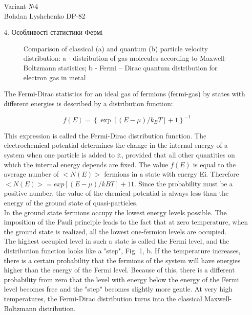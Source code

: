 \documentclass[a4paper,14pt]{extreport}
\begin{document}
\pagecolor{white}


\begin{center}
Variant №4\\
\vspace{0.5cm}
Bohdan Lyshchenko DP-82
\end{center}

\begin{center}
4. Особливості статистики Фермі
\end{center}
\vspace{1cm}



\begin{figure}[h]
\caption{Comparison of classical (a) and quantum (b) particle velocity distribution:
  a - distribution of gas molecules according to Maxwell-Boltzmann statistics;
b - Fermi – Dirac quantum distribution for electron gas in metal}
\label{ris1}
\end{figure}


The Fermi-Dirac statistics for an ideal gas of fermions (fermi-gas) by states with different energies is described by a distribution function:

\begin{equation}
f(E)=\left\{\exp \left[(E-\mu) / k_{B} T\right]+1\right\}^{-1}
\end{equation}

This expression is called the Fermi-Dirac distribution function. The electrochemical potential determines the change in the internal energy of a system when one particle is added to it, provided that all other quantities on which the internal energy depends are fixed.
The value $f(E)$ is equal to the average number of $<N(E)>$ fermions in a state with energy Ei. Therefore $<N (E)> = {exp [(E - \mu) / kBT] + 1} 1$. Since the probability must be a positive number, the value of the chemical potential is always less than the energy of the ground state of quasi-particles.\\

In the ground state fermions occupy the lowest energy levels possible. The imposition of the Pauli principle leads to the fact that at zero temperature, when the ground state is realized, all the lowest one-fermion levels are occupied.\\

The highest occupied level in such a state is called the Fermi level, and the distribution function looks like a "step", Fig. 1, b. If the temperature increases, there is a certain probability that the fermions of the system will have energies higher than the energy of the Fermi level. Because of this, there is a different probability from zero that the level with energy below the energy of the Fermi level becomes free and the "step" becomes slightly more gentle. At very high temperatures, the Fermi-Dirac distribution turns into the classical Maxwell-Boltzmann distribution.
\end{document}
